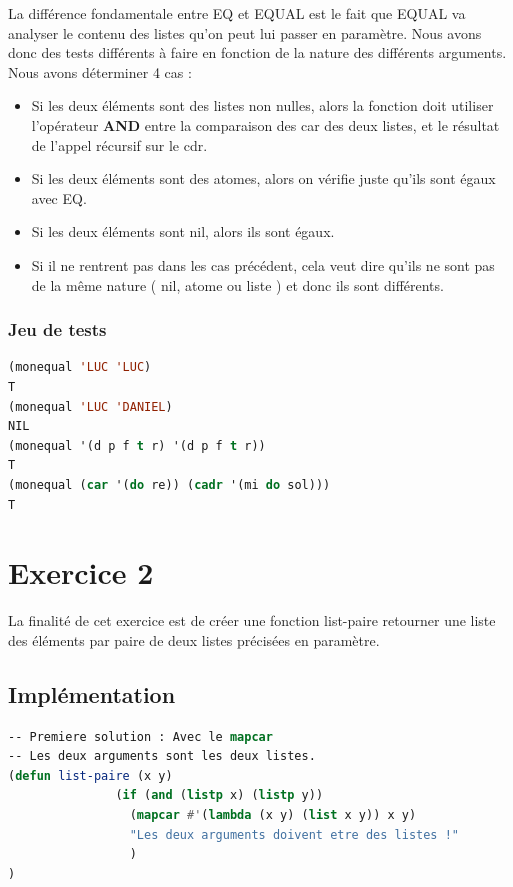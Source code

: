 \documentclass[a4paper,10pt]{report}
\begin{document}
	  La différence fondamentale entre EQ et EQUAL est le fait que EQUAL va analyser le contenu des listes qu'on peut lui passer en paramètre. Nous avons donc des tests différents
	  à faire en fonction de la nature des différents arguments. Nous avons déterminer 4 cas :
	  \begin{itemize}
	   \item Si les deux éléments sont des listes non nulles, alors la fonction doit utiliser l'opérateur \textbf{AND} entre la comparaison des car des deux listes, et le résultat de l'appel récursif sur le cdr.
	   \item Si les deux éléments sont des atomes, alors on vérifie juste qu'ils sont égaux avec EQ.
	   \item Si les deux éléments sont nil, alors ils sont égaux.
	   \item Si il ne rentrent pas dans les cas précédent, cela veut dire qu'ils ne sont pas de la même nature ( nil, atome ou liste ) et donc ils sont différents.
	  \end{itemize}
	  \subsection{Jeu de tests}
	  \begin{lstlisting}[language=Lisp]
(monequal 'LUC 'LUC)
T
(monequal 'LUC 'DANIEL)
NIL
(monequal '(d p f t r) '(d p f t r))
T
(monequal (car '(do re)) (cadr '(mi do sol)))
T

		 \end{lstlisting}
	  \chapter{Exercice 2}
	  
	  
	    La finalité de cet exercice est de créer une fonction list-paire retourner une liste des éléments par paire de deux listes précisées en paramètre.
	  \section{Implémentation}
	  \begin{lstlisting}[language=Lisp]
-- Premiere solution : Avec le mapcar
-- Les deux arguments sont les deux listes.
(defun list-paire (x y)
               (if (and (listp x) (listp y))
                 (mapcar #'(lambda (x y) (list x y)) x y)
                 "Les deux arguments doivent etre des listes !"
                 )
)
	  \end{lstlisting}
\end{document}
